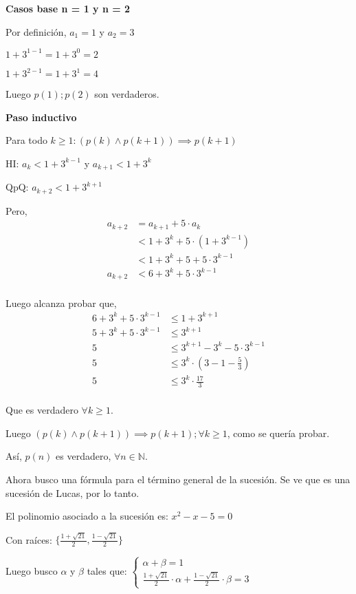 \textbf{Casos base n = 1 y n = 2}

Por definición, $a_1 = 1$ y $a_2 = 3$

$ 1 + 3^{1-1} = 1 + 3^0 = 2$

$ 1 + 3^{2-1} = 1 + 3^1 = 4$

Luego $ p(1); p(2) $ son verdaderos.

\textbf{Paso inductivo}

Para todo $k \geq 1: (p(k) \wedge p(k+1)) \implies p(k+1)$

HI: $ a_k < 1 + 3^{k-1} $ y $ a_{k+1} < 1 + 3^k $

QpQ: $ a_{k+2} < 1 + 3^{k+1} $

Pero,
\begin{align*}
    a_{k+2} &= a_{k+1} + 5\cdot a_k \\
    &< 1 + 3^k + 5\cdot (1 + 3^{k-1}) \\
    &< 1 + 3^k + 5 + 5\cdot 3^{k-1} \\
    a_{k+2} &< 6 + 3^k + 5\cdot 3^{k-1} \\
\end{align*}

Luego alcanza probar que,
\begin{align*}
    6 + 3^k + 5\cdot 3^{k-1} &\leq 1 + 3^{k+1} \\
    5 + 3^k + 5\cdot 3^{k-1} &\leq 3^{k+1} \\
    5 &\leq 3^{k+1} - 3^k - 5\cdot 3^{k-1} \\
    5 &\leq 3^k \cdot (3 - 1 - \frac{5}{3})\\
    5 &\leq 3^k \cdot \frac{17}{3}\\
\end{align*}

Que es verdadero $ \forall k \geq 1 $.

Luego $(p(k) \wedge p(k+1)) \implies p(k+1); \forall k \geq 1$, como se quería probar.

Así, $p(n)$ es verdadero, $\forall n \in \mathbb{N}$.

Ahora busco una fórmula para el término general de la sucesión. Se ve que es una sucesión de Lucas, por lo tanto.

El polinomio asociado a la sucesión es: $ x^2 - x - 5= 0 $

Con raíces: $ \{ \frac{1+\sqrt{21}}{2}, \frac{1-\sqrt{21}}{2} \} $

Luego busco $ \alpha $ y $ \beta $ tales que:
$\begin{cases}
    \alpha + \beta = 1 \\
    \frac{1+\sqrt{21}}{2} \cdot \alpha + \frac{1-\sqrt{21}}{2} \cdot \beta = 3
\end{cases}$

